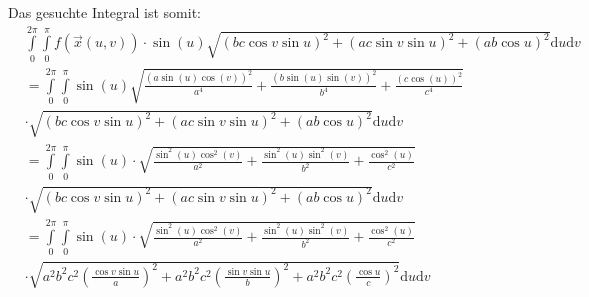 \documentclass[10pt,a4paper,parskip=half]{scrartcl}
\begin{document}
Das gesuchte Integral ist somit:
\begin{align*}
&\int\limits_0^{2\pi} \int\limits_0^{\pi} f(\vec x(u,v)) \cdot \sin(u) \sqrt{\left(bc \cos v \sin u\right)^2 + \left(ac \sin v \sin u\right)^2 + \left(ab \cos u\right)^2} \mathrm d u \mathrm d v \\
&= \int\limits_0^{2\pi} \int\limits_0^{\pi} \sin (u) \sqrt{\frac{(a\sin(u) \cos(v))^2}{a^4} + \frac{(b\sin(u)\sin(v))^2}{b^4} + \frac{(c \cos(u))^2}{c^4}} \\
&\cdot \sqrt{\left(bc \cos v \sin u\right)^2 + \left(ac \sin v \sin u\right)^2 + \left(ab \cos u\right)^2} \mathrm d u \mathrm d v \\
&= \int\limits_0^{2\pi}   \int\limits_0^{\pi} \sin(u) \cdot \sqrt{\frac{\sin^2(u) \cos^2(v)}{a^2} + \frac{\sin^2(u)\sin^2(v)}{b^2} + \frac{\cos^2(u)}{c^2}} \\
&\cdot \sqrt{\left(bc \cos v \sin u\right)^2 + \left(ac \sin v \sin u\right)^2 + \left(ab \cos u\right)^2} \mathrm d u \mathrm d v \\
&= \int\limits_0^{2\pi}   \int\limits_0^{\pi} \sin(u) \cdot \sqrt{\frac{\sin^2(u) \cos^2(v)}{a^2} + \frac{\sin^2(u)\sin^2(v)}{b^2} + \frac{\cos^2(u)}{c^2}} \\
& \cdot \sqrt{a^2b^2c^2\left(\frac{\cos v \sin u}a\right)^2 + a^2b^2c^2\left(\frac{\sin v \sin u}b\right)^2 + a^2b^2c^2 \left(\frac{\cos u}c\right)^2} \mathrm d u \mathrm d v \\

\end{align*}
\end{document}
